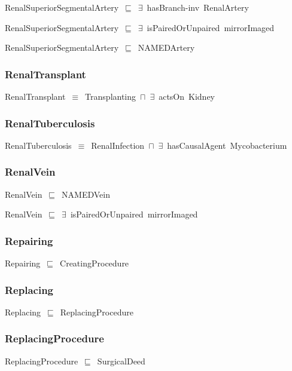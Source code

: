\documentclass{article}
\begin{document}
RenalSuperiorSegmentalArtery~\ensuremath{\sqsubseteq}~\ensuremath{\exists}~hasBranch-inv~RenalArtery~

RenalSuperiorSegmentalArtery~\ensuremath{\sqsubseteq}~\ensuremath{\exists}~isPairedOrUnpaired~mirrorImaged~

RenalSuperiorSegmentalArtery~\ensuremath{\sqsubseteq}~NAMEDArtery~

\subsubsection*{RenalTransplant}

RenalTransplant~\ensuremath{\equiv}~Transplanting~\ensuremath{\sqcap}~\ensuremath{\exists}~actsOn~Kidney

\subsubsection*{RenalTuberculosis}

RenalTuberculosis~\ensuremath{\equiv}~RenalInfection~\ensuremath{\sqcap}~\ensuremath{\exists}~hasCausalAgent~Mycobacterium

\subsubsection*{RenalVein}

RenalVein~\ensuremath{\sqsubseteq}~NAMEDVein~

RenalVein~\ensuremath{\sqsubseteq}~\ensuremath{\exists}~isPairedOrUnpaired~mirrorImaged~

\subsubsection*{Repairing}

Repairing~\ensuremath{\sqsubseteq}~CreatingProcedure~

\subsubsection*{Replacing}

Replacing~\ensuremath{\sqsubseteq}~ReplacingProcedure~

\subsubsection*{ReplacingProcedure}

ReplacingProcedure~\ensuremath{\sqsubseteq}~SurgicalDeed~
\end{document}
